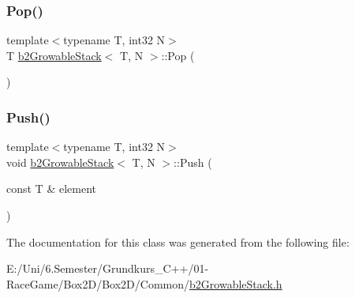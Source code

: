 \mbox{\label{classb2_growable_stack_a53e53dcd6bff8308405a881f02957bc8}} 
\subsubsection{\texorpdfstring{Pop()}{Pop()}}
{\footnotesize\ttfamily template$<$typename T, int32 N$>$ \\
T \mbox{\hyperlink{classb2_growable_stack}{b2\+Growable\+Stack}}$<$ T, N $>$\+::Pop (\begin{DoxyParamCaption}{ }\end{DoxyParamCaption})\hspace{0.3cm}{\ttfamily [inline]}}

\mbox{\label{classb2_growable_stack_a23661327d64ff72d1ec8d6bcdb6d8992}} 
\subsubsection{\texorpdfstring{Push()}{Push()}}
{\footnotesize\ttfamily template$<$typename T, int32 N$>$ \\
void \mbox{\hyperlink{classb2_growable_stack}{b2\+Growable\+Stack}}$<$ T, N $>$\+::Push (\begin{DoxyParamCaption}\item[{const T \&}]{element }\end{DoxyParamCaption})\hspace{0.3cm}{\ttfamily [inline]}}



The documentation for this class was generated from the following file\+:\begin{DoxyCompactItemize}
\item 
E\+:/\+Uni/6.\+Semester/\+Grundkurs\+\_\+\+C++/01-\/\+Race\+Game/\+Box2\+D/\+Box2\+D/\+Common/\mbox{\hyperlink{b2_growable_stack_8h}{b2\+Growable\+Stack.\+h}}\end{DoxyCompactItemize}
